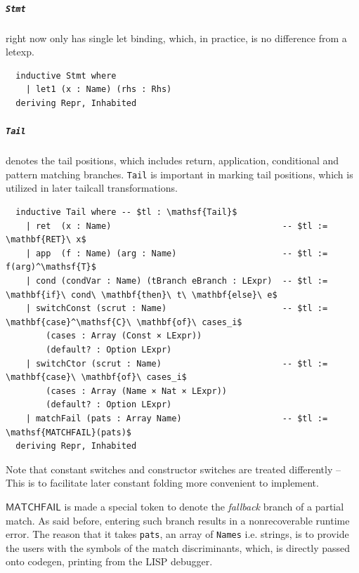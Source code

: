 \documentclass[a4paper, 11pt]{article}
\theoremstyle{remark}\newtheorem*{remark}{Remark}
\theoremstyle{definition}\newtheorem*{definition}{Definition}
\begin{document}
\subparagraph{\texttt{Stmt}} right now only has single let binding, which, in practice, is no difference
from a letexp.
\begin{verbatim}
  inductive Stmt where
    | let1 (x : Name) (rhs : Rhs)
  deriving Repr, Inhabited
\end{verbatim}

\subparagraph{\texttt{Tail}} denotes the tail positions, which includes return, application, conditional and
pattern matching branches. \texttt{Tail} is important in marking tail positions, which is utilized in later
tailcall transformations.
\begin{verbatim}
  inductive Tail where -- $tl : \mathsf{Tail}$
    | ret  (x : Name)                                  -- $tl := \mathbf{RET}\ x$
    | app  (f : Name) (arg : Name)                     -- $tl := f(arg)^\mathsf{T}$
    | cond (condVar : Name) (tBranch eBranch : LExpr)  -- $tl := \mathbf{if}\ cond\ \mathbf{then}\ t\ \mathbf{else}\ e$
    | switchConst (scrut : Name)                       -- $tl := \mathbf{case}^\mathsf{C}\ \mathbf{of}\ cases_i$
        (cases : Array (Const × LExpr))
        (default? : Option LExpr)
    | switchCtor (scrut : Name)                        -- $tl := \mathbf{case}\ \mathbf{of}\ cases_i$
        (cases : Array (Name × Nat × LExpr))
        (default? : Option LExpr)
    | matchFail (pats : Array Name)                    -- $tl := \mathsf{MATCHFAIL}(pats)$
  deriving Repr, Inhabited
\end{verbatim}
Note that constant switches and constructor switches are treated differently -- This is to
facilitate later constant folding more convenient to implement.

$\mathsf{MATCHFAIL}$ is made a special token to denote the \emph{fallback} branch of a partial match. As said before,
entering such branch results in a nonrecoverable runtime error. The reason that it takes \texttt{pats}, an array of \texttt{Names} i.e.
strings, is to provide the users with the symbols of the match discriminants, which, is directly passed onto codegen, printing
from the LISP debugger.
\end{document}
